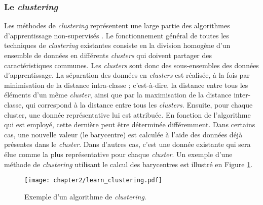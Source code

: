 \subsubsection{Le \textit{clustering}}

Les méthodes de \textit{clustering} représentent une large partie des algorithmes d'apprentissage non-supervisés \citep{Witten2016}. Le fonctionnement général de toutes les techniques de \textit{clustering} existantes consiste en la division homogène d'un ensemble de données en différents \textit{clusters} qui doivent partager des caractéristiques communes. Les \textit{clusters} sont donc des sous-ensembles des données d'apprentissage. La séparation des données en \textit{clusters} est réalisée, à la fois par minimisation de la distance intra-classe ; c'est-à-dire, la distance entre tous les éléments d'un même \textit{cluster}, ainsi que par la maximisation de la distance inter-classe, qui correspond à la distance entre tous les \textit{clusters}. Ensuite, pour chaque cluster, une donnée représentative lui est attribuée. En fonction de l'algorithme qui est employé, cette dernière peut être déterminée différemment. Dans certains cas, une nouvelle valeur (le barycentre) est calculée à l'aide des données déjà présentes dans le \textit{cluster}. Dans d'autres cas, c'est une donnée existante qui sera élue comme la plus représentative pour chaque \textit{cluster}. Un exemple d'une méthode de \textit{clustering} utilisant le calcul des barycentres est illustré en Figure \ref{fig:learn_clustering}.

\begin{figure}[H]
	\centering
	\texttt{[image: chapter2/learn\_clustering.pdf]}
	\caption{Exemple d'un algorithme de \textit{clustering}.}
	\label{fig:learn_clustering}
\end{figure}

